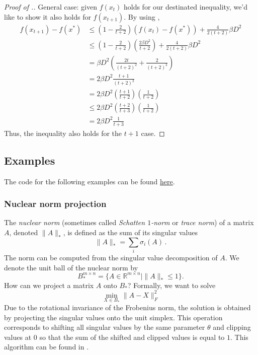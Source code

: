 \begin{proof}[Proof of .]
General case: given $f(x_t)$ holds for our destinated inequality, we'd like to show it also holds for $f(x_{t+1})$. By using ,
\begin{align*} f(x_{t+1})-f(x^*) &\leq (1- \frac{2}{t+2}) (f(x_t)-f(x^*))+ \frac{4}{2(t+2)} \beta D^2 \\
& \leq (1- \frac{2}{t+2}) (\frac{2\beta D^2}{t+2})+ \frac{4}{2(t+2)} \beta D^2 \\
& = \beta D^2 (\frac{2t}{(t+2)^2} +\frac{2}{(t+2)^2}) \\
& = 2\beta D^2 \frac{t+1}{(t+2)^2} \\
& = 2\beta D^2 (\frac{t+1}{t+2}) (\frac{1}{t+2}) \\
& \leq 2\beta D^2 (\frac{t+2}{t+3}) (\frac{1}{t+2}) \\
& = 2\beta D^2 \frac{1}{t+3}
\end{align*}
Thus, the inequality also holds for the $t+1$ case.

\end{proof}

\subsection{Examples}
The code for the following examples can be found \href{https://ee227c.github.io/code/lecture5.html}{here}.

\subsubsection{Nuclear norm projection}
The \textit{nuclear norm} (sometimes called \textit{Schatten $1$-norm} or \textit{trace norm}) of a matrix $A$, denoted $\|A\|_*$, is defined as the sum of its singular values
\[
\|A\|_* = \sum_i \sigma_i(A)\,.
\]
The norm can be computed from the singular value decomposition of $A$.
We denote the unit ball of the nuclear norm by 
\[
B_*^{m\times n}=\{A\in\mathbb{R}^{m\times n} \mid \|A\|_*\le 1\}.
\]
How can we project a matrix $A$ onto $B_*$? Formally, we want to solve
\[
\min_{X\in B_*}\|A-X\|_F^2
\]
Due to the rotational invariance of the Frobenius norm, the solution is obtained by projecting the singular values onto the unit simplex. This operation corresponds to shifting all singular values by the same parameter $\theta$ and clipping values at $0$ so that the sum of the shifted and clipped values is equal to $1$. This algorithm can be found in \cite{Duchi2008}.

